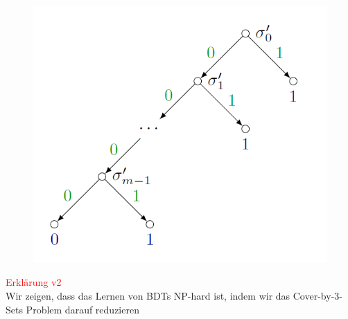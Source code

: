\documentclass[12pt,a4paper]{article}
\newcommand{\red}[1]{\textcolor{red} {#1}}
\begin{document}
\begin{figure}[H]
\centering
\includegraphics[scale=0.5]{./resources/btd_np.png}
\end{figure}
\red{Erklärung v2}\\
Wir zeigen, dass das Lernen von BDTs NP-hard ist, indem wir das Cover-by-3-Sets Problem darauf reduzieren
\end{document}

